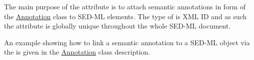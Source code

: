\subsubsection{}
\label{sec:metaID}
The main purpose of the  attribute is to attach semantic annotations in form of the \hyperref[class:annotation]{Annotation} class to SED-ML elements.  The type of  is XML ID and as such the  attribute is globally unique throughout the whole SED-ML document. 

An example showing how to link a semantic annotation to a SED-ML object via the  is given in the \hyperref[class:annotation]{Annotation} class description.
